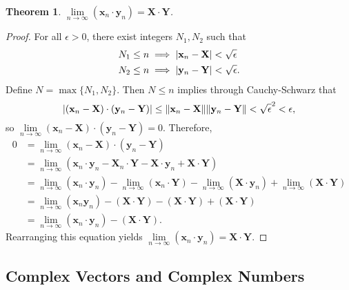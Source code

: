 \documentclass[11pt]{article}
\renewcommand{\vec}[1]{\mathbf{#1}}
\newtheorem{theorem}{Theorem}
\begin{document}
\begin{theorem}
	$\lim\limits_{n \to \infty} (\vec{x}_{n} \cdot \vec{y}_{n}) = \vec{X} \cdot \vec{Y}$.
\end{theorem}
\begin{adjustwidth}{0.5cm}{}
	\begin{proof}
		For all $\epsilon > 0$, there exist integers $N_{1}, N_{2}$ such that
		\begin{align*}
			N_{1} \le n & \implies \abs{\vec{x}_{n} - \vec{X}} < \sqrt{\epsilon}  \\
			N_{2} \le n & \implies \abs{\vec{y}_{n} - \vec{Y}} < \sqrt{\epsilon}.
		\end{align*}
		Define $N = \max \{N_{1}, N_{2}\}$. Then $N \le n$ implies through Cauchy-Schwarz that
		\[
			\abs{(\vec{x}_{n} - \vec{X}) \cdot (\vec{y}_{n} - \vec{Y})} \le \norm{\vec{x}_{n} - \vec{X}} \norm{\vec{y}_{n} - \vec{Y}} < \sqrt{\epsilon}^{2} < \epsilon,
		\]
		so $\lim\limits_{n \to \infty} (\vec{x}_{n} - \vec{X}) \cdot  (\vec{y}_{n} - \vec{Y}) = 0$. Therefore,
		\begin{align*}
			0 & = \lim\limits_{n \to \infty} (\vec{x}_{n} - \vec{X}) \cdot (\vec{y}_{n} - \vec{Y}) \\
			  & = \lim\limits_{n \to \infty}  (\vec{x}_{n} \cdot \vec{y}_{n} - \vec{X}_{n} \cdot \vec{Y} - \vec{X} \cdot \vec{y}_{n} + \vec{X} \cdot \vec{Y}) \\
			  & = \lim\limits_{n \to \infty} (\vec{x}_{n} \cdot \vec{y}_{n}) - \lim\limits_{n \to \infty} (\vec{x}_{n} \cdot \vec{Y}) - \lim\limits_{n \to \infty} (\vec{X} \cdot \vec{y}_{n}) + \lim\limits_{n \to \infty} (\vec{X} \cdot \vec{Y}) \\
			  & = \lim\limits_{n \to \infty} (\vec{x}_{n}\vec{y}_{n}) - (\vec{X} \cdot \vec{Y}) - (\vec{X} \cdot \vec{Y}) + (\vec{X} \cdot \vec{Y}) \\
			  & = \lim\limits_{n \to \infty} (\vec{x}_{n} \cdot \vec{y}_{n}) - (\vec{X} \cdot \vec{Y}).
		\end{align*}
		Rearranging this equation yields $\lim\limits_{n \to \infty} (\vec{x}_{n} \cdot \vec{y}_{n}) = \vec{X} \cdot \vec{Y}$.
	\end{proof}
\end{adjustwidth}


\subsection{Complex Vectors and Complex Numbers}
\end{document}
